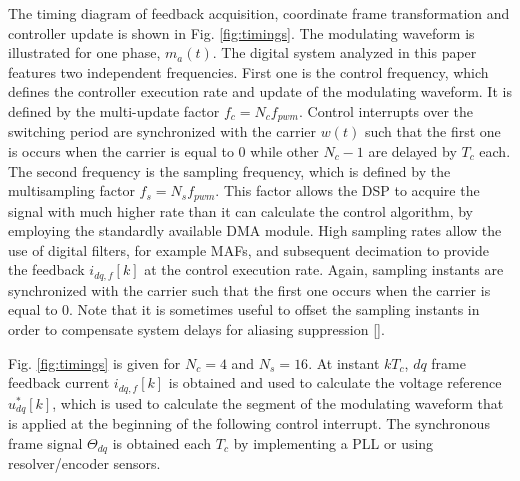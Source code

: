 \documentclass[journal]{IEEEtran}
\begin{document}
The timing diagram of feedback acquisition, coordinate frame transformation and controller update is shown in Fig. \ref{fig:timings}. The modulating waveform is illustrated for one phase, $m_a(t)$.
The digital system analyzed in this paper features two independent frequencies. First one is the control frequency, which defines the controller execution rate and update of the modulating waveform. It is defined by the multi-update factor $f_c = N_c f_{pwm}$. Control interrupts over the switching period are synchronized with the carrier $w(t)$ such that the first one is occurs when the carrier is equal to $0$ while other $N_c-1$ are delayed by $T_c$ each. 
The second frequency is the sampling frequency, which is defined by the multisampling factor $f_s = N_s f_{pwm}$. This factor allows the DSP to acquire the signal with much higher rate than it can calculate the control algorithm, by employing the standardly available DMA module. High sampling rates allow the use of digital filters, for example MAFs, and subsequent decimation to provide the feedback $i_{dq,f}[k]$ at the control execution rate.
Again, sampling instants are synchronized with the carrier such that the first one occurs when the carrier is equal to $0$. Note that it is sometimes useful to offset the sampling instants in order to compensate system delays for aliasing suppression [].


Fig. \ref{fig:timings} is given for $N_c = 4$ and $N_s = 16$. At instant $kT_c$, $dq$ frame feedback current $i_{dq,f}[k]$ is obtained and used to calculate the voltage reference $u^*_{dq}[k]$, which is used to calculate the segment of the modulating waveform that is applied at the beginning of the following control interrupt. The synchronous frame signal $\Theta_{dq}$ is obtained each $T_c$ by implementing a PLL or using resolver/encoder sensors. 
\end{document}
